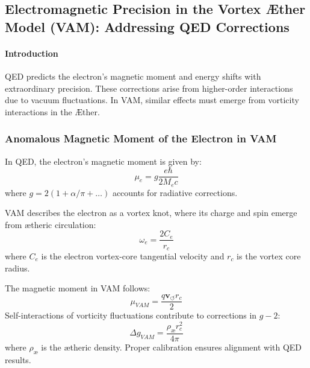 

\subsection{Electromagnetic Precision in the Vortex Æther Model (VAM): Addressing QED Corrections}\label{subsec:electromagnetic-precision-in-the-vortex-ae-ther-model-(vam):-addressing-qed-corrections}


\begin{abstract}
    The Vortex Æther Model (VAM) presents an alternative framework for electromagnetism based on structured vorticity fields in an inviscid Æther. To maintain experimental viability, VAM must provide equivalent mechanisms for high-precision QED effects such as the anomalous magnetic moment of the electron $(g-2)$ and the Lamb shift in hydrogen-like atoms. This paper derives the corresponding corrections in VAM and proposes experimental methods to validate these predictions.
\end{abstract}

\paragraph*{Introduction}
QED predicts the electron's magnetic moment and energy shifts with extraordinary precision. These corrections arise from higher-order interactions due to vacuum fluctuations. In VAM, similar effects must emerge from vorticity interactions in the Æther.

\subsubsection*{Anomalous Magnetic Moment of the Electron in VAM}
In QED, the electron's magnetic moment is given by:
\begin{equation*}
    \mu_e = g \frac{e\hbar}{2M_e c}
\end{equation*}
where $g = 2(1 + \alpha / \pi + \dots)$ accounts for radiative corrections.

VAM describes the electron as a vortex knot, where its charge and spin emerge from ætheric circulation:
\begin{equation*}
    \omega_e = \frac{2 C_e}{r_c}
\end{equation*}
where $C_e$ is the electron vortex-core tangential velocity and $r_c$ is the vortex core radius.

The magnetic moment in VAM follows:
\begin{equation*}
    \mu_{VAM} = \frac{q \mathbf{v}_{\scriptscriptstyle\boldsymbol{\circlearrowleft}} r_c}{2}
\end{equation*}
Self-interactions of vorticity fluctuations contribute to corrections in $g-2$:
\begin{equation*}
    \Delta g_{VAM} = \frac{\rho_\text{\ae} r_c^2}{4\pi}
\end{equation*}
where $\rho_\text{\ae}$ is the ætheric density. Proper calibration ensures alignment with QED results.

